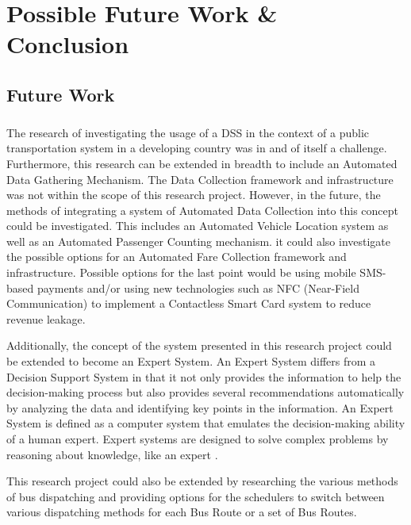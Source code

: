 
\chapter {Possible Future Work \& Conclusion }
\label{chapter-ConclusionAndFutureWork}

\section{Future Work}
\label{section-FutureWork}

\paragraph{} The research of investigating the usage of a DSS in the context of a public transportation system in a developing country was in and of itself a challenge. Furthermore, this research can be extended in breadth to include an Automated Data Gathering Mechanism. The Data Collection framework and infrastructure was not within the scope of this research project. However, in the future, the methods of integrating a system of Automated Data Collection into this concept could be investigated. This includes an Automated Vehicle Location system as well as an Automated Passenger Counting mechanism. it could also investigate the possible options for an Automated Fare Collection framework and infrastructure. Possible options for the last point would be using mobile SMS-based payments and/or using new technologies such as NFC (Near-Field Communication) to implement a Contactless Smart Card system to reduce revenue leakage.

Additionally, the concept of the system presented in this research project could be extended to become an Expert System. An Expert System differs from a Decision Support System in that it not only provides the information to help the decision-making process but also provides several recommendations automatically by analyzing the data and identifying key points in the information. An Expert System is defined as a computer system that emulates the decision-making ability of a human expert. Expert systems are designed to solve complex problems by reasoning about knowledge, like an expert \cite{Jackson1998}.

This research project could also be extended by researching the various methods of bus dispatching and providing options for the schedulers to switch between various dispatching methods for each Bus Route or a set of Bus Routes.

